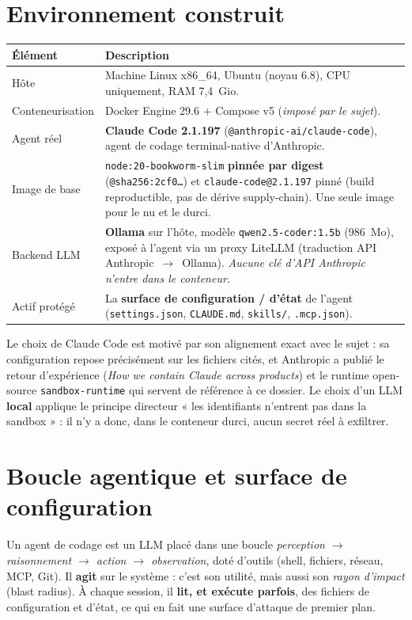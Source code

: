 \documentclass[11pt,a4paper]{article}
\begin{document}
\tableofcontents
\newpage

\section{Environnement construit}
\begin{longtable}{@{}p{4.3cm}p{10.7cm}@{}}
\toprule
\textbf{Élément} & \textbf{Description} \\ \midrule
Hôte & Machine Linux x86\_64, Ubuntu (noyau 6.8), CPU uniquement, RAM 7,4~Gio. \\
Conteneurisation & Docker Engine 29.6 + Compose v5 (\emph{imposé par le sujet}). \\
Agent réel & \textbf{Claude Code 2.1.197} (\texttt{@anthropic-ai/claude-code}), agent de codage terminal-native d'Anthropic. \\
Image de base & \texttt{node:20-bookworm-slim} \textbf{pinnée par digest} (\texttt{@sha256:2cf0\ldots}) et \texttt{claude-code@2.1.197} pinné (build reproductible, pas de dérive supply-chain). Une seule image pour le nu et le durci. \\
Backend LLM & \textbf{Ollama} sur l'hôte, modèle \texttt{qwen2.5-coder:1.5b} (986~Mo), exposé à l'agent via un proxy LiteLLM (traduction API Anthropic~$\rightarrow$~Ollama). \emph{Aucune clé d'API Anthropic n'entre dans le conteneur.} \\
Actif protégé & La \textbf{surface de configuration / d'état} de l'agent (\texttt{settings.json}, \texttt{CLAUDE.md}, \texttt{skills/}, \texttt{.mcp.json}). \\ \bottomrule
\end{longtable}

\noindent Le choix de Claude Code est motivé par son alignement exact avec le sujet : sa configuration
repose précisément sur les fichiers cités, et Anthropic a publié le retour d'expérience
(\emph{How we contain Claude across products}) et le runtime open-source \texttt{sandbox-runtime}
qui servent de référence à ce dossier. Le choix d'un LLM \textbf{local} applique le principe
directeur « les identifiants n'entrent pas dans la sandbox » : il n'y a donc, dans le conteneur
durci, aucun secret réel à exfiltrer.

\section{Boucle agentique et surface de configuration}
Un agent de codage est un LLM placé dans une boucle \emph{perception $\rightarrow$ raisonnement
$\rightarrow$ action $\rightarrow$ observation}, doté d'outils (shell, fichiers, réseau, MCP, Git).
Il \textbf{agit} sur le système : c'est son utilité, mais aussi son \emph{rayon d'impact} (blast
radius). À chaque session, il \textbf{lit, et exécute parfois}, des fichiers de configuration
et d'état, ce qui en fait une surface d'attaque de premier plan.
\end{document}
